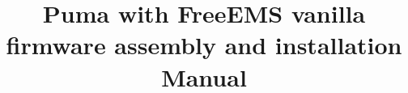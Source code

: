 \documentclass[12pt,a4paper,titlepage]{article}
\author{}
\title{Puma with FreeEMS vanilla firmware assembly and  installation Manual}
\begin{document}
\maketitle
\pagebreak


\tableofcontents








\end{document}
